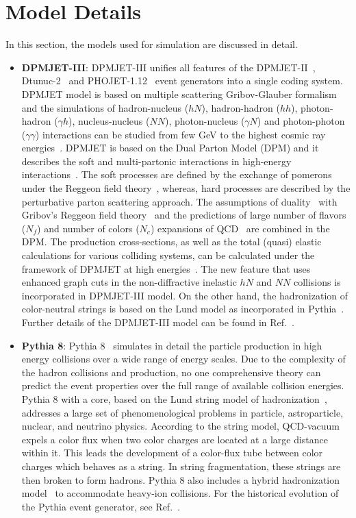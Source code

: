 \documentclass{article}
\begin{document}
\section{Model Details}\label{sec2}
In this section, the models used for simulation are discussed in detail. 
\begin{itemize}
    \item \textbf{DPMJET-III}: DPMJET-III unifies all features of the DPMJET-II~\cite{22}, Dtunuc-2~\cite{23, 24} and PHOJET-1.12~\cite{25} event generators into a single coding system. DPMJET model is based on multiple scattering Gribov-Glauber formalism and the  simulations of hadron-nucleus ($hN$), hadron-hadron ($hh$), photon-hadron ($\gamma h$), nucleus-nucleus ($NN$), photon-nucleus ($\gamma N$) and photon-photon ($\gamma \gamma$)  interactions can be studied from few GeV to the highest cosmic ray energies~\cite{26}. 
    DPMJET is based on the Dual Parton Model (DPM) and it describes the soft and multi-partonic interactions in high-energy interactions~\cite{26}. The soft processes are defined by the exchange of pomerons under the Reggeon field theory~\cite{27}, whereas, hard processes are described by the perturbative parton scattering approach. The assumptions of duality~\cite{28} with Gribov's Reggeon field theory~\cite{27} and the predictions of large number of flavors ($N_f$) and number of colors ($N_c$) expansions of QCD~\cite{29} are combined in the DPM. The production cross-sections, as well as the total (quasi) elastic calculations for various colliding systems, can be calculated under the framework of DPMJET at high energies~\cite{30}. The new feature that uses enhanced graph cuts in the non-diffractive inelastic $hN$ and $NN$ collisions is incorporated in DPMJET-III model. On the other hand, the hadronization of color-neutral strings is based on the Lund model as incorporated in Pythia~\cite{31, 32}. Further details of the DPMJET-III model can be found in Ref.~\cite{26}.


\item \textbf{Pythia 8}: Pythia 8~\cite{26, 31, 32, 33} simulates  in detail the particle production in high energy collisions over a wide range of energy scales. Due to the complexity of the hadron collisions and production, no one comprehensive theory can predict the event properties over the full range of available collision energies. Pythia 8 with a core, based on the Lund string model of hadronization~\cite{34}, addresses a large set of phenomenological problems in particle, astroparticle, nuclear, and neutrino physics. According to the string model,  QCD-vacuum expels a color flux when two color charges are located at a large distance within it. This leads the development of a color-flux tube between color charges which behaves as a string. In string fragmentation, these strings are then broken to form hadrons. Pythia 8 also includes a hybrid hadronization model~\cite{35} to accommodate heavy-ion collisions. For the historical evolution of the Pythia event generator, see Ref.~\cite{36}.


\end{itemize}
\end{document}
